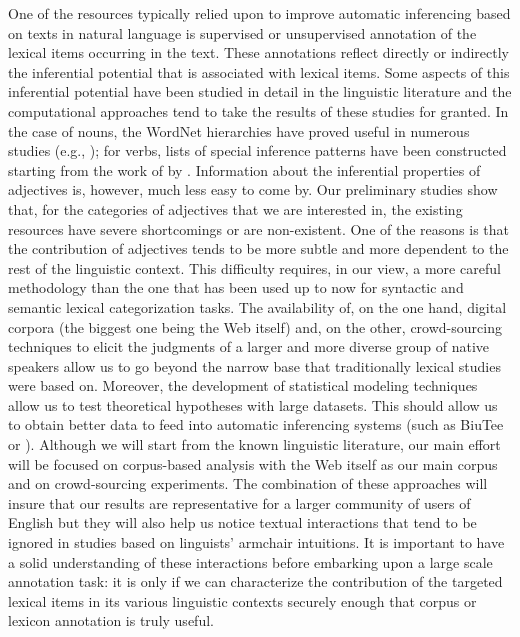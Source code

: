 \documentclass[10pt]{article}
\begin{document}
One of the resources  typically relied upon to improve automatic inferencing based on texts in natural language is supervised or unsupervised annotation of the lexical items occurring in the text. These annotations reflect directly or indirectly the inferential potential that is associated with lexical items. Some aspects of this inferential potential have been studied in detail in the linguistic literature and the computational approaches tend to take the results of these studies for granted. 
In the case of nouns, the WordNet hierarchies have proved useful in numerous studies (e.g., \cite{snow04}); for verbs, lists of special inference patterns have been constructed starting from the work of \cite{kiparsky+kiparsky:1970,karttunen:1971} by \cite{nairn+condoravdi+karttunen:2006,sauri:2008phd,factbank:2009,lotan:2012}. Information about the inferential properties of adjectives is, however, much less easy to come by. Our preliminary studies show that, for the categories of adjectives that we are interested in, the existing resources have severe shortcomings or are non-existent. One of the reasons is that the contribution of adjectives tends to be more subtle and more dependent to the rest of the linguistic context. This difficulty requires, in our view, a more careful methodology than the one that has been used up to now for syntactic and semantic lexical categorization tasks. The availability of, on the one hand, digital corpora (the biggest one being the Web itself) and, on the other, crowd-sourcing techniques to elicit the judgments of a larger and more diverse group of native speakers allow us to go beyond the narrow base that traditionally lexical studies were based on. Moreover, the development of statistical modeling techniques allow us to test theoretical hypotheses with large datasets. This should allow us to obtain better data to feed into automatic inferencing systems (such as BiuTee \cite{stern+dagan:2011} or \cite{clark2007role}). 
Although we will start from the known linguistic literature, our main effort will be focused on corpus-based analysis with the Web itself as our main corpus and on crowd-sourcing experiments. The combination of these approaches will insure that our results are representative for a larger community of users of English but they will also help us notice textual interactions that tend to be ignored in studies based on linguists' armchair intuitions.  It is important to have a solid understanding of these interactions before embarking upon a large scale annotation task: it is only if we can characterize the contribution of the targeted lexical items in its various linguistic contexts securely enough that corpus or lexicon annotation is truly useful. 
\end{document}
